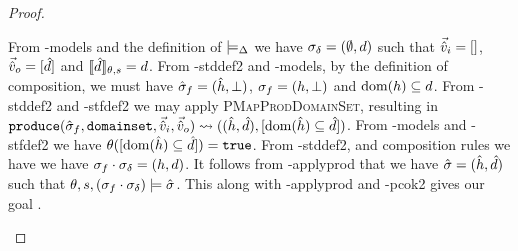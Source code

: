 \begin{proof}
\begin{hypvlist}
 From \hyp{models} and the definition of $\models_{\Delta}$ we have $\sigma_\delta=(\emptyset,d)$ such that $\vec{\hat{v}}_i=[]$, $\vec{\hat{v}}_o=[\hat{d}]$ and $\llbracket\hat{d}\rrbracket_{\theta,s}=d$.
 From \hyp{stddef2} and \hyp{models}, by the definition of composition, we must have $\hat{\sigma}_f=(\hat{h},\bot)$, $\sigma_f=(h,\bot)$ and $\operatorname{dom}(h)\subseteq d$.
 From \hyp{stddef2} and \hyp{stfdef2} we may apply \textsc{PMapProdDomainSet}, resulting in $\\\texttt{produce}(\hat{\sigma}_f,\texttt{domainset},\vec{\hat{v}}_i,\vec{\hat{v}}_o)\rightsquigarrow ((\hat{h}, \hat{d}), [\operatorname{dom}(\hat{h})\subseteq \hat{d}])$.
 From \hyp{models} and \hyp{stfdef2} we have $\theta([\operatorname{dom}(\hat{h})\subseteq \hat{d}])=\texttt{true}$.
 From \hyp{stddef2},  and composition rules we have we have $\sigma_f\cdot\sigma_\delta=(h,d)$. It follows from \hyp{applyprod} that we have $\hat{\sigma}=(\hat{h},\hat{d})$ such that $\theta,s,(\sigma_f\cdot\sigma_\delta)\models\hat{\sigma}$. This along with \hyp{applyprod} and \hyp{pcok2} gives our goal .
\end{hypvlist}

\end{proof}

